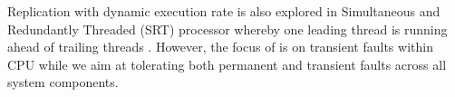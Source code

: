 Replication with dynamic execution rate is also explored in Simultaneous and Redundantly Threaded (SRT) processor whereby one leading thread is running ahead of trailing threads \cite{reinhardt2000transient}. However, 
the focus of \cite{reinhardt2000transient} is on transient faults within CPU while we aim at tolerating both permanent and transient faults across all system components.
